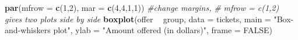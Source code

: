 \documentclass[
]{book}
\newenvironment{Shaded}{\begin{snugshade}}{\end{snugshade}}
\newcommand{\CommentTok}[1]{\textcolor[rgb]{0.56,0.35,0.01}{\textit{#1}}}
\newcommand{\DataTypeTok}[1]{\textcolor[rgb]{0.13,0.29,0.53}{#1}}
\newcommand{\DecValTok}[1]{\textcolor[rgb]{0.00,0.00,0.81}{#1}}
\newcommand{\KeywordTok}[1]{\textcolor[rgb]{0.13,0.29,0.53}{\textbf{#1}}}
\newcommand{\NormalTok}[1]{#1}
\newcommand{\OperatorTok}[1]{\textcolor[rgb]{0.81,0.36,0.00}{\textbf{#1}}}
\newcommand{\OtherTok}[1]{\textcolor[rgb]{0.56,0.35,0.01}{#1}}
\newcommand{\StringTok}[1]{\textcolor[rgb]{0.31,0.60,0.02}{#1}}
\begin{document}
\begin{Shaded}
\begin{Highlighting}[]
\KeywordTok{par}\NormalTok{(}\DataTypeTok{mfrow =} \KeywordTok{c}\NormalTok{(}\DecValTok{1}\NormalTok{,}\DecValTok{2}\NormalTok{), }\DataTypeTok{mar =} \KeywordTok{c}\NormalTok{(}\DecValTok{4}\NormalTok{,}\DecValTok{4}\NormalTok{,}\DecValTok{1}\NormalTok{,}\DecValTok{1}\NormalTok{)) }\CommentTok{#change margins,}
\CommentTok{# mfrow = c(1,2) gives two plots side by side}
\KeywordTok{boxplot}\NormalTok{(offer }\OperatorTok{~}\StringTok{ }\NormalTok{group, }\DataTypeTok{data =}\NormalTok{ tickets, }
        \DataTypeTok{main =} \StringTok{"Box-and-whiskers plot"}\NormalTok{, }
        \DataTypeTok{ylab =} \StringTok{"Amount offered (in dollars)"}\NormalTok{,}
        \DataTypeTok{frame =} \OtherTok{FALSE}\NormalTok{)}


\end{Highlighting}
\end{Shaded}
\end{document}
